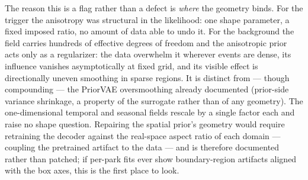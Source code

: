 The reason this is a flag rather than a defect is \emph{where} the geometry
binds. For the trigger the anisotropy was structural in the likelihood: one
shape parameter, a fixed imposed ratio, no amount of data able to undo it.
For the background the field carries hundreds of effective degrees of
freedom and the anisotropic prior acts only as a regularizer: the data
overwhelm it wherever events are dense, its influence vanishes
asymptotically at fixed grid, and its visible effect is directionally uneven
smoothing in sparse regions. It is distinct from --- though compounding ---
the PriorVAE oversmoothing already documented (prior-side variance
shrinkage, a property of the surrogate rather than of any geometry). The
one-dimensional temporal and seasonal fields rescale by a single factor each
and raise no shape question. Repairing the spatial prior's geometry would
require retraining the decoder against the real-space aspect ratio of each
domain --- coupling the pretrained artifact to the data --- and is therefore
documented rather than patched; if per-park fits ever show boundary-region
artifacts aligned with the box axes, this is the first place to look.

